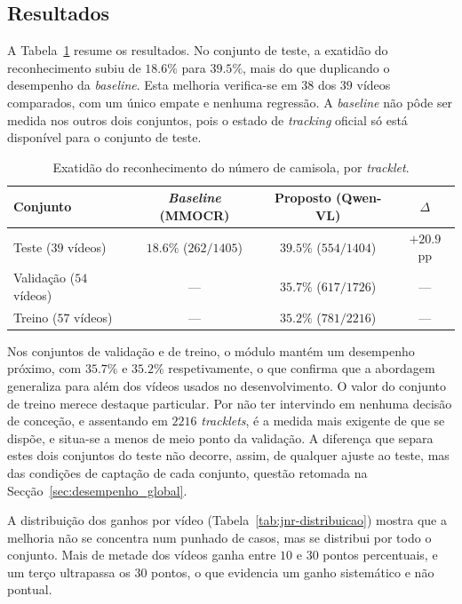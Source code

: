 \subsection{Resultados}
\label{sec:res_jnr_resultados}

A Tabela~\ref{tab:jnr} resume os resultados. No conjunto de teste, a exatidão do
reconhecimento subiu de $18.6\%$ para $39.5\%$, mais do que duplicando o desempenho da
\emph{baseline}. Esta melhoria verifica-se em $38$ dos $39$ vídeos comparados, com um
único empate e nenhuma regressão. A \emph{baseline} não pôde ser medida nos outros dois
conjuntos, pois o estado de \emph{tracking} oficial só está disponível para o conjunto de
teste.

\begin{table}[htbp]
    \centering
    \caption{Exatidão do reconhecimento do número de camisola, por \emph{tracklet}.}
    \label{tab:jnr}
    \begin{tabular}{lccc}
        \hline
        \textbf{Conjunto} & \textit{\textbf{Baseline}} \textbf{(MMOCR)} & \textbf{Proposto (Qwen-VL)} & \textbf{$\Delta$} \\
        \hline
        Teste ($39$ vídeos)     & $18.6\%$ ($262/1405$) & $39.5\%$ ($554/1404$) & $+20.9$ pp \\
        Validação ($54$ vídeos) & ---                   & $35.7\%$ ($617/1726$) & --- \\
        Treino ($57$ vídeos)    & ---                   & $35.2\%$ ($781/2216$) & --- \\
        \hline
    \end{tabular}
\end{table}

Nos conjuntos de validação e de treino, o módulo mantém um desempenho próximo, com
$35.7\%$ e $35.2\%$ respetivamente, o que confirma que a abordagem generaliza para além
dos vídeos usados no desenvolvimento. O valor do conjunto de treino merece destaque
particular. Por não ter intervindo em nenhuma decisão de conceção, e assentando em $2216$
\emph{tracklets}, é a medida mais exigente de que se dispõe, e situa-se a menos de meio
ponto da validação. A diferença que separa estes dois conjuntos do teste não decorre,
assim, de qualquer ajuste ao teste, mas das condições de captação de cada conjunto,
questão retomada na Secção~\ref{sec:desempenho_global}.

A distribuição dos ganhos por vídeo (Tabela~\ref{tab:jnr-distribuicao}) mostra que a
melhoria não se concentra num punhado de casos, mas se distribui por todo o conjunto. Mais
de metade dos vídeos ganha entre $10$ e $30$ pontos percentuais, e um terço ultrapassa os
$30$ pontos, o que evidencia um ganho sistemático e não pontual.

